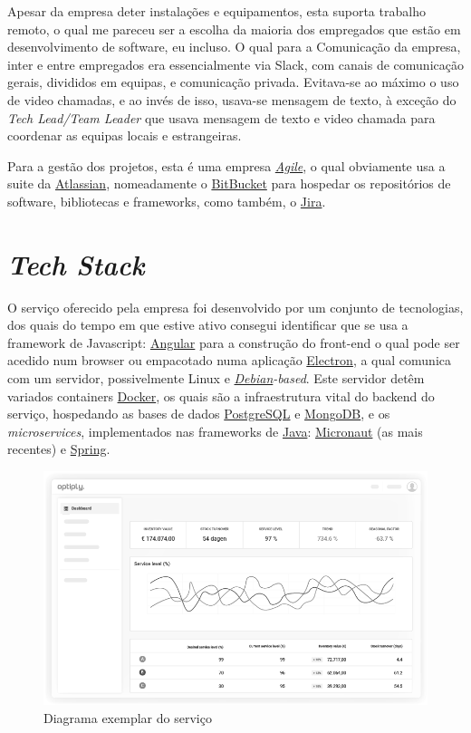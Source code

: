Apesar da empresa deter instalações e equipamentos, esta suporta trabalho remoto, o qual me pareceu ser a escolha da maioria dos empregados que estão em desenvolvimento de software, eu incluso. O qual para a Comunicação da empresa, inter e entre empregados era essencialmente via Slack, com canais de comunicação gerais, divididos em equipas, e comunicação privada. Evitava-se ao máximo o uso de video chamadas, e ao invés de isso, usava-se mensagem de texto, à exceção do \textit{Tech Lead/Team Leader} que usava mensagem de texto e video chamada para coordenar as equipas locais e estrangeiras.

Para a gestão dos projetos, esta é uma empresa \href{https://www.atlassian.com/agile}{\textit{Agile}}, o qual obviamente usa a suite da \href{https://www.atlassian.com/}{Atlassian}, nomeadamente o \href{https://bitbucket.org/}{BitBucket} para hospedar os repositórios de software, bibliotecas e frameworks, como também, o \href{https://jira.atlassian.com/}{Jira}.

\section{\textit{Tech Stack}}

O serviço oferecido pela empresa foi desenvolvido por um conjunto de tecnologias, dos quais do tempo em que estive ativo consegui identificar que se usa a framework de Javascript: \href{https://angular.io/}{Angular} para a construção do front-end o qual pode ser acedido num browser ou empacotado numa aplicação \href{https://www.electronjs.org/}{Electron}, a qual comunica com um servidor, possivelmente Linux e \textit{\href{https://www.debian.org/}{Debian}-based}. Este servidor detêm variados containers \href{https://www.docker.com/}{Docker}, os quais são a infraestrutura vital do backend do serviço, hospedando as bases de dados \href{https://www.postgresql.org/}{PostgreSQL} e \href{https://www.mongodb.com/}{MongoDB}, e os \textit{microservices}, implementados nas frameworks de \href{https://jdk.java.net/}{Java}: \href{https://micronaut.io/}{Micronaut} (as mais recentes) e \href{https://spring.io/}{Spring}.

\begin{figure}[!hbt]
  \centering
  \includegraphics[width=12cm]{figuras/lol.png}
  \caption{Diagrama exemplar do serviço}
  \label{fig:diag_eg}
\end{figure}
\FloatBarrier
